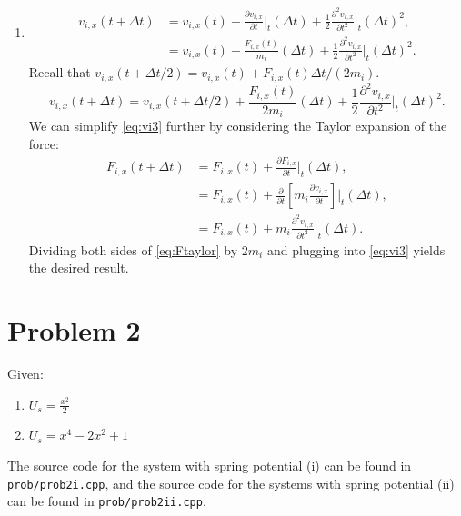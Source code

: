 \documentclass{article}
\begin{document}
\begin{enumerate}[label=\alph*)]
\begin{enumerate}[label=\roman*]
    \end{enumerate}
  \item \begin{align*}
      v_{i,x}(t + \Delta t) & = v_{i,x}(t) + \frac{\partial v_{i,x}}{\partial t}\Bigr|_{t} (\Delta t) + \frac{1}{2} \frac{\partial^2 v_{i,x}}{\partial t^2}\Bigr|_{t} (\Delta t)^2, \\
                            & = v_{i,x}(t) + \frac{F_{i,x}(t)}{m_i} (\Delta t) + \frac{1}{2} \frac{\partial^2 v_{i,x}}{\partial t^2}\Bigr|_{t} (\Delta t)^2.
    \end{align*}
    Recall that $v_{i,x}(t + \Delta t / 2) = v_{i,x}(t) + F_{i,x}(t) \Delta t/(2m_i)$.
    \begin{equation} \label{eq:vi3}
      v_{i,x}(t + \Delta t) = v_{i,x}(t + \Delta t / 2) + \frac{F_{i,x}(t)}{2m_i}(\Delta t) + \frac{1}{2} \frac{\partial^2 v_{i,x}}{\partial t^2}\Bigr|_{t} (\Delta t)^2.
    \end{equation}
    We can simplify \eqref{eq:vi3} further by considering the Taylor expansion of the force:
    \begin{align}
    F_{i,x}(t + \Delta t) & = F_{i,x}(t) + \frac{\partial F_{i,x}}{\partial t}\Bigr|_{t} (\Delta t), \\
                          & = F_{i,x}(t) + \frac{\partial}{\partial t}\left[m_i \frac{\partial v_{i,x}}{\partial t}\right]\Bigr|_{t} (\Delta t), \\
      \label{eq:Ftaylor} & = F_{i,x}(t) + m_i \frac{\partial^2 v_{i,x}}{\partial t^2}\Bigr|_{t}(\Delta t).
    \end{align}
    Dividing both sides of \eqref{eq:Ftaylor} by $2m_i$ and plugging into \eqref{eq:vi3} yields the desired result.
\end{enumerate}

\section{Problem 2}

Given:
\begin{enumerate}[label=\roman*]
  \item $U_s = \frac{x^2}{2}$
  \item $U_s = x^4 - 2x^2 + 1$
\end{enumerate}

The source code for the system with spring potential (i) can be found in \texttt{prob/prob2i.cpp}, and the source code for the systems with spring potential (ii) can be found in \texttt{prob/prob2ii.cpp}.
\end{document}
